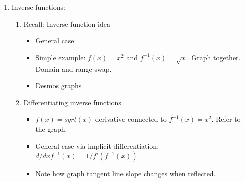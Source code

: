 \documentclass{article}
\begin{document}
\begin{enumerate}
\item Inverse functions:
\begin{enumerate}
\item Recall: Inverse function idea
\begin{itemize}
\item General case
\item Simple example: $f(x)=x^2$ and $f^{-1}(x)=\sqrt{x}$. Graph together. Domain and range swap. 
\item Desmos graphs
\end{itemize}

\item Differentiating inverse functions
\begin{itemize}
\item $f(x) = sqrt(x)$ derivative connected to $f^{-1}(x)=x^2$. Refer to the graph.
\item General case via implicit differentiation: $d/dx f^{-1}(x) = 1/f'(f^{-1}(x))$
\item Note how graph tangent line slope changes when reflected.
\end{itemize}

\end{enumerate}


\end{enumerate}
\end{document}
